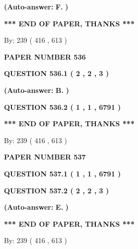 \documentclass[12pt]{article}
\begin{document}
 
{\textbf{(Auto-answer:}}
{\textbf{\large{
F.}}}
{\textbf{)}}
 
 
   
   
   
   
\vspace{1.0in} 
{\textbf{\large{ *** END OF PAPER, THANKS *** }}} 
   
   
\hspace{1.0in} By: 
 239 ( 416 ,  613 )
   
   
   
   
\newpage 
\setcounter{page}{ 
   536001 } 
   
   
 {\textbf{ \Large{ PAPER NUMBER  536  }}}
   
   
   
   
  
  
{\textbf{\large{QUESTION
536.1 
 ( 2 , 2 , 3 )
}}}
 
 
{\textbf{(Auto-answer:}}
{\textbf{\large{
B.}}}
{\textbf{)}}
 
 
  
  
{\textbf{\large{QUESTION
536.2 
 ( 1 , 1 , 6791 )
}}}
   
   
   
   
\vspace{1.0in} 
{\textbf{\large{ *** END OF PAPER, THANKS *** }}} 
   
   
\hspace{1.0in} By: 
 239 ( 416 ,  613 )
   
   
   
   
\newpage 
\setcounter{page}{ 
   537001 } 
   
   
 {\textbf{ \Large{ PAPER NUMBER  537  }}}
   
   
   
   
  
  
{\textbf{\large{QUESTION
537.1 
 ( 1 , 1 , 6791 )
}}}
  
  
{\textbf{\large{QUESTION
537.2 
 ( 2 , 2 , 3 )
}}}
 
 
{\textbf{(Auto-answer:}}
{\textbf{\large{
E.}}}
{\textbf{)}}
 
 
   
   
   
   
\vspace{1.0in} 
{\textbf{\large{ *** END OF PAPER, THANKS *** }}} 
   
   
\hspace{1.0in} By: 
 239 ( 416 ,  613 )
   
   
   
   
\newpage 
\setcounter{page}{ 
   538001 } 
   
\end{document}
